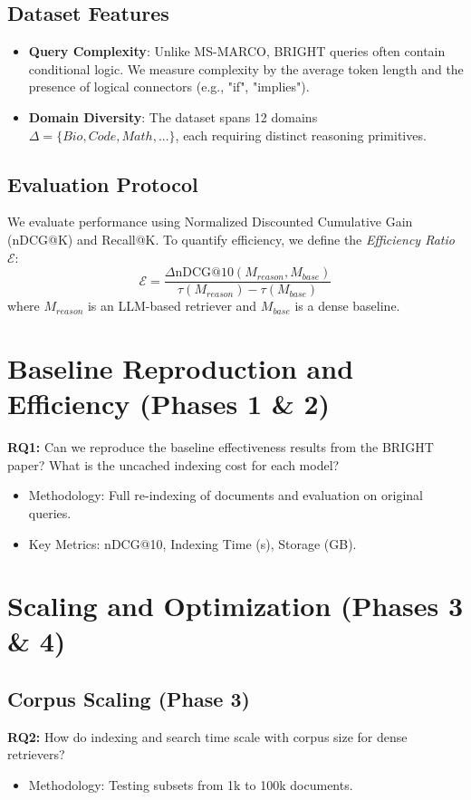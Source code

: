 \documentclass[sigconf]{acmart}
\begin{document}
\subsection{Dataset Features}
\begin{itemize}
    \item \textbf{Query Complexity}: Unlike MS-MARCO, BRIGHT queries often contain conditional logic. We measure complexity by the average token length and the presence of logical connectors (e.g., "if", "implies").
    \item \textbf{Domain Diversity}: The dataset spans 12 domains $\Delta = \{Bio, Code, Math, ...\}$, each requiring distinct reasoning primitives.
\end{itemize}

\subsection{Evaluation Protocol}
We evaluate performance using Normalized Discounted Cumulative Gain (nDCG@K) and Recall@K. To quantify efficiency, we define the \textit{Efficiency Ratio} $\mathcal{E}$:
\begin{equation}
    \mathcal{E} = \frac{\Delta \text{nDCG@10}(M_{reason}, M_{base})}{\tau(M_{reason}) - \tau(M_{base})}
\end{equation}
where $M_{reason}$ is an LLM-based retriever and $M_{base}$ is a dense baseline.

\section{Baseline Reproduction and Efficiency (Phases 1 \& 2)}
\textbf{RQ1:} Can we reproduce the baseline effectiveness results from the BRIGHT paper? What is the uncached indexing cost for each model?
\begin{itemize}
    \item Methodology: Full re-indexing of documents and evaluation on original queries.
    \item Key Metrics: nDCG@10, Indexing Time (s), Storage (GB).
\end{itemize}

\section{Scaling and Optimization (Phases 3 \& 4)}
\subsection{Corpus Scaling (Phase 3)}
\textbf{RQ2:} How do indexing and search time scale with corpus size for dense retrievers?
\begin{itemize}
    \item Methodology: Testing subsets from 1k to 100k documents.
\end{itemize}
\end{document}
